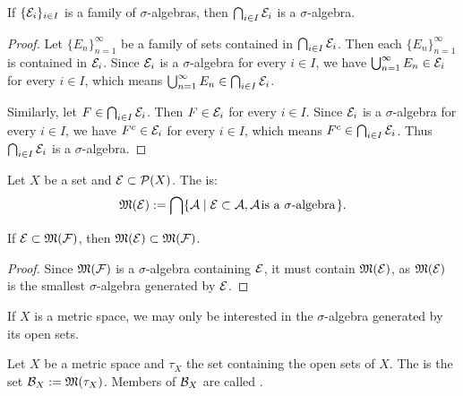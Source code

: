     \begin{proposition}
        If $\{\cE_i\}_{i \in I}$ is a family of $\sigma$-algebras, then $\bigcap_{i \in I}\cE_i$ is a $\sigma$-algebra.
    \end{proposition}
        \begin{proof}
            Let $\{E_n\}_{n = 1}^\infty$ be a family of sets contained in $\bigcap_{i \in I}\cE_i$. Then each $\{E_n\}_{n = 1}^\infty$ is contained in $\cE_i$. Since $\cE_i$ is a $\sigma$-algebra for every $i \in I$, we have $\bigcup_{n = 1}^\infty E_n \in \cE_i$ for every $i \in I$, which means $\bigcup_{n = 1}^\infty E_n \in \bigcap_{i \in I}\cE_i$.

            Similarly, let $F \in \bigcap_{i \in I}\cE_i$. Then $F \in \cE_i$ for every $i \in I$. Since $\cE_i$ is a $\sigma$-algebra for every $i \in I$, we have $F^c \in \cE_i$ for every $i \in I$, which means $F^c \in \bigcap_{i \in I}\cE_i$. Thus $\bigcap_{i \in I}\cE_i$ is a $\sigma$-algebra.
        \end{proof}

    \begin{definition}
        Let $X$ be a set and $\cE \subset \cP(X)$. The  is:
            \begin{equation*}
            \begin{split}
                \fM(\cE) := \bigcap \{\cA \mid \cE \subset \cA, \cA \h1\text{is a $\sigma$-algebra}\h1\}.
            \end{split}
            \end{equation*}
    \end{definition}

    \begin{lemma}
        If $\cE \subset \fM(\cF)$, then $\fM(\cE) \subset \fM(\cF)$.
    \end{lemma}
        \begin{proof}
            Since $\fM(\cF)$ is a $\sigma$-algebra containing $\cE$, it must contain $\fM(\cE)$, as $\fM(\cE)$ is the smallest $\sigma$-algebra generated by $\cE$.
        \end{proof}

    If $X$ is a metric space, we may only be interested in the $\sigma$-algebra generated by its open sets.

    \begin{definition}
        Let $X$ be a metric space and $\tau_X$ the set containing the open sets of $X$. The  is the set $\cB_X := \fM(\tau_X)$. Members of $\cB_X$ are called .
    \end{definition}

